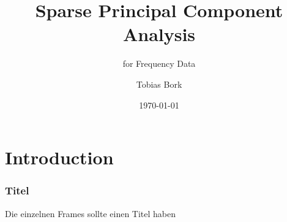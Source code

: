 \documentclass{beamer}
\begin{document}
\title{Sparse Principal Component Analysis}
\subtitle{for Frequency Data}   
\author{Tobias Bork} 
\date{\today}

\begin{frame}
\titlepage
\end{frame}



\section{Introduction} 
\begin{frame}
\frametitle{Titel} 
Die einzelnen Frames sollte einen Titel haben 
\end{frame}

\end{document}
